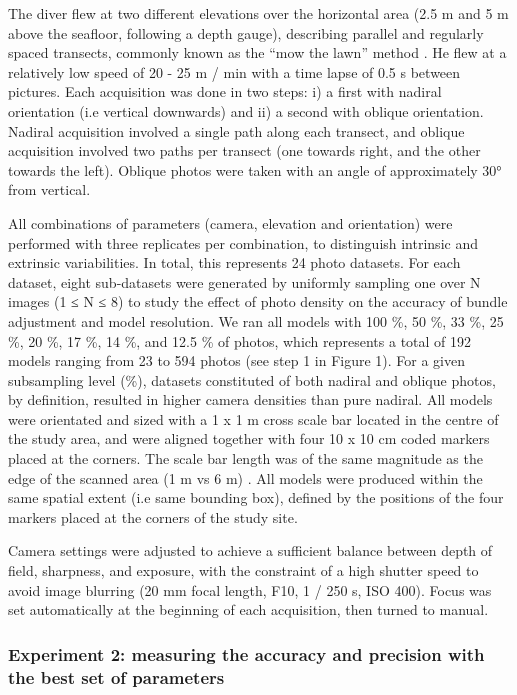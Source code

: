 The diver flew at two different elevations over the horizontal area (2.5 m and 5 m above the seafloor, following a depth gauge), describing parallel and regularly spaced transects, commonly known as the “mow the lawn” method \citep{pizarro_simple_2017}. He flew at a relatively low speed of 20 - 25 m / min with a time lapse of 0.5 s between pictures. Each acquisition was done in two steps: i) a first with nadiral orientation (i.e vertical downwards) and ii) a second with oblique orientation. Nadiral acquisition involved a single path along each transect, and oblique acquisition involved two paths per transect (one towards right, and the other towards the left). Oblique photos were taken with an angle of approximately 30° from vertical.
\medskip

All combinations of parameters (camera, elevation and orientation) were performed with three replicates per combination, to distinguish intrinsic and extrinsic variabilities. In total, this represents 24 photo datasets. For each dataset, eight sub-datasets were generated by uniformly sampling one over N images (1 ≤ N ≤ 8) to study the effect of photo density on the accuracy of bundle adjustment and model resolution. We ran all models with 100 \%, 50 \%, 33 \%, 25 \%, 20 \%, 17 \%, 14 \%, and 12.5 \% of photos, which represents a total of 192 models ranging from 23 to 594 photos (see step 1 in Figure 1). For a given subsampling level (\%), datasets constituted of both nadiral and oblique photos, by definition, resulted in higher camera densities than pure nadiral. All models were orientated and sized with a 1 x 1 m cross scale bar located in the centre of the study area, and were aligned together with four 10 x 10 cm coded markers placed at the corners. The scale bar length was of the same magnitude as the edge of the scanned area (1 m vs 6 m) \citep{vdi/vde_optical_2002}. All models were produced within the same spatial extent (i.e same bounding box), defined by the positions of the four markers placed at the corners of the study site.
\medskip

Camera settings were adjusted to achieve a sufficient balance between depth of field, sharpness, and exposure, with the constraint of a high shutter speed to avoid image blurring (20 mm focal length, F10, 1 / 250 s, ISO 400). Focus was set automatically at the beginning of each acquisition, then turned to manual.

\subsubsection{Experiment 2: measuring the accuracy and precision with the best set of parameters}\label{chapitre1_2.1.2}

